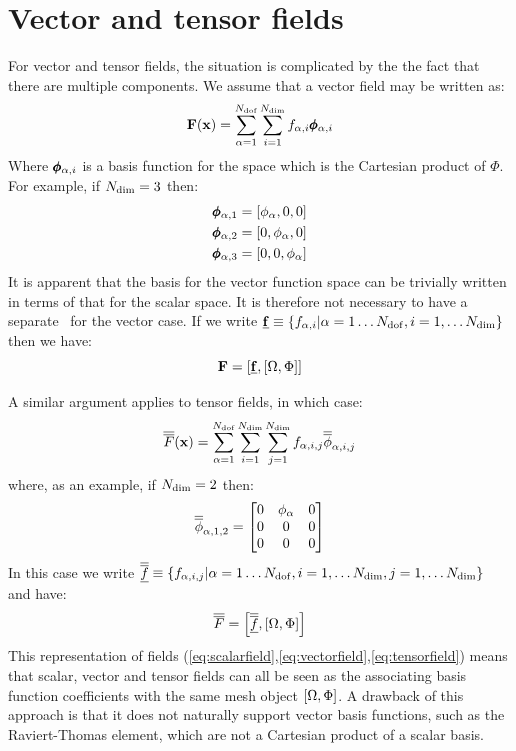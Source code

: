 \documentclass[a4paper, 11pt]{book}
\begin{document}
\section{Vector and tensor fields}\label{sec:vectorfields}

For vector and tensor fields, the situation is complicated by the the fact
that there are multiple components. We assume that a vector field may be
written as:
\begin{equation}
  \mathbf{F}(\mathbf{x})=\sum_{\alpha=1}^{N_\mathrm{dof}}\sum_{i=1}^{N_\mathrm{dim}} f_{\alpha,i}\pmb{\phi}_{\alpha,i}
\end{equation}
Where $\pmb{\phi}_{\alpha,i}$ is a basis function for
the space which is the Cartesian product of $\Phi$. For example, if
$N_\mathrm{dim}=3$ then:
\begin{gather}
  \pmb{\phi}_{\alpha,1}=[\phi_\alpha, 0, 0]\\
  \pmb{\phi}_{\alpha,2}=[0, \phi_\alpha, 0]\\
  \pmb{\phi}_{\alpha,3}=[0, 0, \phi_\alpha]
\end{gather}
It is apparent that the basis for the vector function space can be
trivially written in terms of that for the scalar space. It is therefore not
necessary to have a separate \meshtype\ for the vector case. If we write
$\underline{\mathbf{f}}\equiv\{f_{\alpha,i}|\alpha=1\ldots N_\mathrm{dof}, i=1,\ldots N_\mathrm{dim}\}$ then
we have:
\begin{equation}\label{eq:vectorfield}
  \mathbf{F}=\left[\underline{\mathbf{f}},[\Omega,\Phi]\right]
\end{equation}

A similar argument applies to tensor fields, in which case:
\begin{equation}
  \overline{\overline{F}}(\mathbf{x})=\sum_{\alpha=1}^{N_\mathrm{dof}} \sum_{i=1}^{N_\mathrm{dim}}\sum_{j=1}^{N_\mathrm{dim}}
  f_{\alpha,i,j}\overline{\overline{\phi}}_{\alpha,i,j}
\end{equation}
where, as an example, if $N_\mathrm{dim}=2$ then:
\begin{equation}
  \overline{\overline{\phi}}_{\alpha, 1, 2}=
  \begin{bmatrix}
    0 & \phi_\alpha & 0\\
    0 & 0 & 0\\
    0 & 0 & 0
  \end{bmatrix}
\end{equation}
In this case we write $\underline{\overline{\overline{f}}}\equiv\{f_{\alpha,i,j}|\alpha=1\ldots
N_\mathrm{dof}, i=1,\ldots N_\mathrm{dim}, j=1,\ldots N_\mathrm{dim}\}$ and have:
\begin{equation}\label{eq:tensorfield}
  \overline{\overline{F}}=\left[\underline{\overline{\overline{f}}},[\Omega,\Phi]\right]
\end{equation}
This representation of fields
(\ref{eq:scalarfield},\ref{eq:vectorfield},\ref{eq:tensorfield}) means that
scalar, vector and tensor fields can all be seen as the associating basis
function coefficients with the same mesh object $[\Omega,\Phi]$. A drawback
of this approach is that it does not naturally support vector basis
functions, such as the Raviert-Thomas element, which are not a Cartesian
product of a scalar basis.
\end{document}
